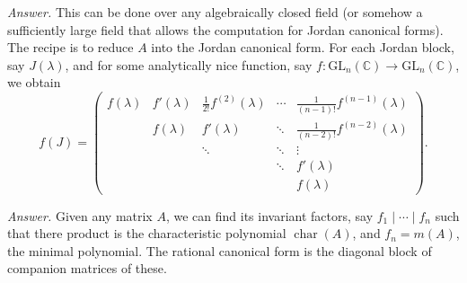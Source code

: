 \documentclass{mathproblems}
\newcommand\C{\mathbb{C}}
\newcommand\GL{\mathrm{GL}}
\begin{document}
\begin{questions}
\textit{Answer.} This can be done over any algebraically closed field (or somehow a sufficiently large field that allows the computation for Jordan canonical forms). The recipe is to reduce $A$ into the Jordan canonical form. For each Jordan block, say $J(\lambda)$, and for some analytically nice function, say $f:\GL_n(\C)\to \GL_n(\C)$, we obtain
$$
f(J)=\begin{pmatrix}
f(\lambda) & f'(\lambda) & \frac{1}{2!}f^{(2)}(\lambda) & \cdots & \frac{1}{(n-1)!}f^{(n-1)}(\lambda)\\
& f(\lambda) & f'(\lambda) & \ddots & \frac{1}{(n-2)!}f^{(n-2)}(\lambda)\\
& & \ddots & \ddots & \vdots \\
& & & \ddots & f'(\lambda) \\
& & & & f(\lambda)
\end{pmatrix}.
$$


\textit{Answer.} Given any matrix $A$, we can find its invariant factors, say $f_1\mid \cdots \mid f_n$ such that there product is the characteristic polynomial $\operatorname{char}(A)$, and $f_n=m(A)$, the minimal polynomial. The rational canonical form is the diagonal block of companion matrices of these.




\end{questions}
\end{document}
